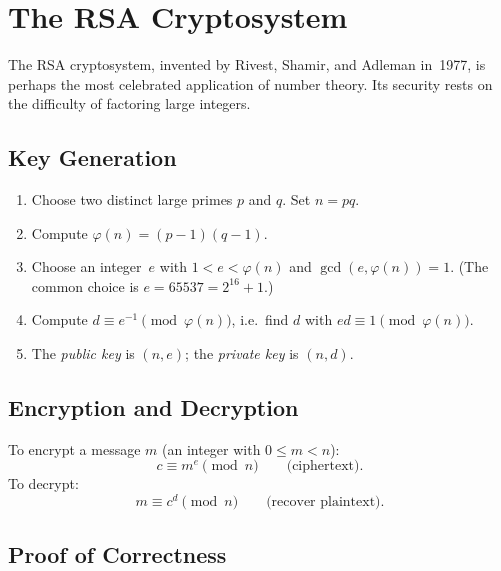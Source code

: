 \documentclass[12pt,a4paper,openany]{book}
\theoremstyle{definition}
\theoremstyle{plain}
\theoremstyle{remark}
\begin{document}
\section{The RSA Cryptosystem}
\label{sec:rsa}

The RSA cryptosystem, invented by Rivest, Shamir, and Adleman%
 in~1977, is perhaps the most
celebrated application of number theory.  Its security rests on the
difficulty of factoring large integers.

\subsection{Key Generation}
\label{subsec:rsa-keygen}

\begin{enumerate}
  \item Choose two distinct large primes $p$ and $q$.  Set $n = pq$.
  \item Compute $\varphi(n) = (p-1)(q-1)$.
  \item Choose an integer~$e$ with $1 < e < \varphi(n)$ and $\gcd(e, \varphi(n)) = 1$.
        (The common choice is $e = 65537 = 2^{16} + 1$.)
  \item Compute $d \equiv e^{-1} \pmod{\varphi(n)}$, i.e.\ find $d$ with
        $ed \equiv 1 \pmod{\varphi(n)}$.
  \item The \emph{public key} is $(n, e)$; the
        \emph{private key} is $(n, d)$.
\end{enumerate}

\subsection{Encryption and Decryption}
\label{subsec:rsa-enc-dec}

To encrypt a message $m$ (an integer with $0 \le m < n$):
\[
  c \equiv m^e \pmod{n} \qquad \text{(ciphertext)}.
\]
To decrypt:
\[
  m \equiv c^d \pmod{n} \qquad \text{(recover plaintext)}.
\]

\subsection{Proof of Correctness}
\label{subsec:rsa-proof}
\end{document}
